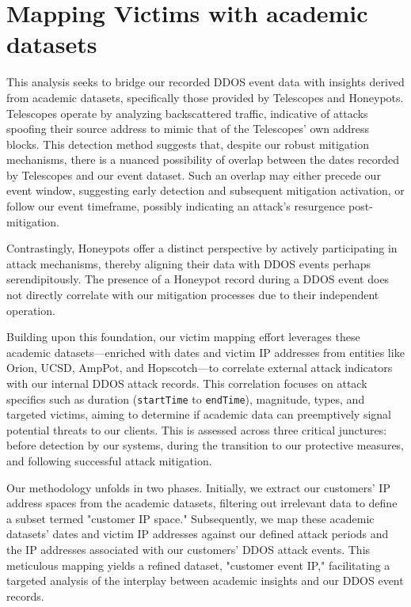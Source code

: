 

\section{Mapping Victims with academic datasets}\label{sec:mapping_victim}
This analysis seeks to bridge our recorded DDOS event data with insights derived from academic datasets, specifically those provided by Telescopes and Honeypots. Telescopes operate by analyzing backscattered traffic, indicative of attacks spoofing their source address to mimic that of the Telescopes' own address blocks. This detection method suggests that, despite our robust mitigation mechanisms, there is a nuanced possibility of overlap between the dates recorded by Telescopes and our event dataset. Such an overlap may either precede our event window, suggesting early detection and subsequent mitigation activation, or follow our event timeframe, possibly indicating an attack's resurgence post-mitigation.

Contrastingly, Honeypots offer a distinct perspective by actively participating in attack mechanisms, thereby aligning their data with DDOS events perhaps serendipitously. The presence of a Honeypot record during a DDOS event does not directly correlate with our mitigation processes due to their independent operation.

Building upon this foundation, our victim mapping effort leverages these academic datasets—enriched with dates and victim IP addresses from entities like Orion, UCSD, AmpPot, and Hopscotch—to correlate external attack indicators with our internal DDOS attack records. This correlation focuses on attack specifics such as duration (\texttt{startTime} to \texttt{endTime}), magnitude, types, and targeted victims, aiming to determine if academic data can preemptively signal potential threats to our clients. This is assessed across three critical junctures: before detection by our systems, during the transition to our protective measures, and following successful attack mitigation.

Our methodology unfolds in two phases. Initially, we extract our customers' IP address spaces from the academic datasets, filtering out irrelevant data to define a subset termed "customer IP space." Subsequently, we map these academic datasets' dates and victim IP addresses against our defined attack periods and the IP addresses associated with our customers' DDOS attack events. This meticulous mapping yields a refined dataset, "customer event IP," facilitating a targeted analysis of the interplay between academic insights and our DDOS event records.

